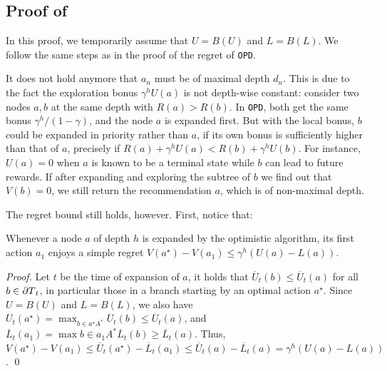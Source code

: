 \documentclass[runningheads]{llncs}
\begin{document}
\subsection{Proof of }
In this proof, we temporarily assume that $U=B(U)$ and $L=B(L)$. We follow the same steps as in the proof of the regret of \texttt{OPD}.

\begin{remark}
It does not hold anymore that $a_n$ must be of maximal depth $d_n$.  This is due to the fact the exploration bonus $\gamma^h U(a)$ is not depth-wise constant: consider two nodes $a,b$ at the same depth with $R(a) > R(b)$. In \texttt{OPD}, both get the same bonus $\gamma^h/(1-\gamma)$, and the node $a$ is expanded first. But with the local bonus, $b$ could be expanded in priority rather than $a$, if its own bonus is sufficiently higher than that of $a$, precisely if $R(a)+\gamma^h U(a) < R(b)+\gamma^h U(b)$. For instance, $U(a)=0$ when $a$ is known to be a terminal state while $b$ can lead to future rewards. If after expanding and exploring the subtree of $b$ we find out that $V(b) = 0$, we still return the recommendation $a$, which is of non-maximal depth.
\end{remark}

The regret bound still holds, however. First, notice that:
\begin{lemma}
\label{lemma:expansion-bound}
Whenever a node $a$ of depth $h$ is expanded by the optimistic algorithm, its first action $a_1$ enjoys a simple regret $V(a^\star)-V(a_1) \leq \gamma^h(U(a)-L(a))$. 
\end{lemma}
\begin{proof}
Let $t$ be the time of expansion of $a$, it holds that $\overline{U}_t(b) \leq \overline{U}_t(a)$ for all $b\in {\partial T}_t$, in particular those in a branch starting by an optimal action $a^\star$. Since $U=B(U)$ and $L=B(L)$, we also have $\overline{U}_t(a^\star) = \max_{b\in a^\star A^*} \overline{U}_t(b) \leq \overline{U}_t(a)$, and $\overline{L}_t(a_1) = \max{b\in a_1 A^*} \overline{L}_t(b) \geq  \overline{L}_t(a)$. Thus, $V(a^\star)-V(a_1) \leq \overline{U}_t(a^\star) - \overline{L}_t(a_1) \leq \overline{U}_t(a) - \overline{L}_t(a) = \gamma^h(U(a)-L(a))$.
\qed\end{proof}
 
\end{document}
